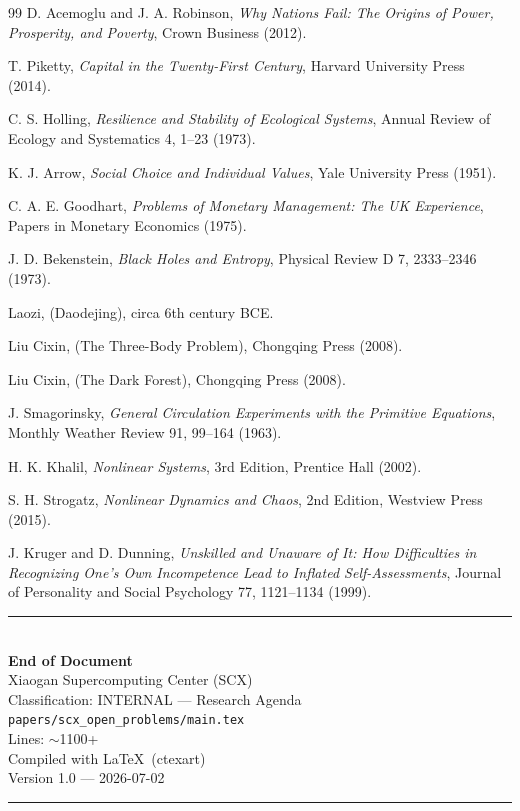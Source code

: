 \documentclass[12pt,a4paper]{article}
\theoremstyle{remark}
\begin{document}
\begin{thebibliography}{99}
D. Acemoglu and J. A. Robinson, \textit{Why Nations Fail: The Origins of Power, Prosperity, and Poverty}, Crown Business (2012).

T. Piketty, \textit{Capital in the Twenty-First Century}, Harvard University Press (2014).

C. S. Holling, \textit{Resilience and Stability of Ecological Systems}, Annual Review of Ecology and Systematics 4, 1--23 (1973).

K. J. Arrow, \textit{Social Choice and Individual Values}, Yale University Press (1951).

C. A. E. Goodhart, \textit{Problems of Monetary Management: The UK Experience}, Papers in Monetary Economics (1975).

J. D. Bekenstein, \textit{Black Holes and Entropy}, Physical Review D 7, 2333--2346 (1973).

Laozi, \textit{} (Daodejing), circa 6th century BCE.

Liu Cixin, \textit{} (The Three-Body Problem), Chongqing Press (2008).

Liu Cixin, \textit{} (The Dark Forest), Chongqing Press (2008).

J. Smagorinsky, \textit{General Circulation Experiments with the Primitive Equations}, Monthly Weather Review 91, 99--164 (1963).

H. K. Khalil, \textit{Nonlinear Systems}, 3rd Edition, Prentice Hall (2002).

S. H. Strogatz, \textit{Nonlinear Dynamics and Chaos}, 2nd Edition, Westview Press (2015).

J. Kruger and D. Dunning, \textit{Unskilled and Unaware of It: How Difficulties in Recognizing One's Own Incompetence Lead to Inflated Self-Assessments}, Journal of Personality and Social Psychology 77, 1121--1134 (1999).

\end{thebibliography}

\newpage


\begin{center}
    \rule{\textwidth}{1pt}\\[0.5cm]
    {\large \textbf{ End of Document}}\\[0.3cm]
    {\small Xiaogan Supercomputing Center (SCX)}\\
    {\small Classification: INTERNAL — Research Agenda}\\
    {\small \texttt{papers/scx\_open\_problems/main.tex}}\\
    {\small Lines: $\sim$1100+}\\
    {\small Compiled with \LaTeX\ (ctexart)}\\
    {\small Version 1.0 — 2026-07-02}\\
    \vspace{0.5cm}
    \rule{\textwidth}{1pt}
\end{center}
\end{document}
